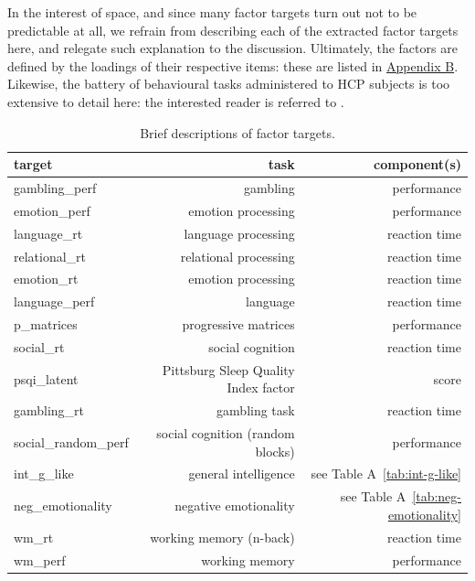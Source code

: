 \documentclass{article}
\begin{document}
%

In the interest of space, and since many factor targets turn out not to be
predictable at all, we refrain from describing each of the extracted factor
targets here, and relegate such explanation to the discussion. Ultimately,
the factors are defined by the loadings of their respective items: these are
listed in \hyperref[sec:appendix-b]{Appendix B}. Likewise, the battery of
behavioural tasks administered to HCP subjects is too extensive to detail
here: the interested reader is referred to \citet{Barch2013}.

\begin{table}
\centering
\caption{Brief descriptions of factor targets. } \label{tab:target-descs}
\begin{tabular}{lrr}
	\toprule
	target & task & component(s)  \\
	\midrule
	gambling\_perf       & gambling              & performance   \\
	emotion\_perf        & emotion processing    & performance   \\
	language\_rt         & language processing   & reaction time \\
	relational\_rt       & relational processing & reaction time \\
	emotion\_rt          & emotion processing    & reaction time \\
	language\_perf       & language              & reaction time \\
	p\_matrices          & progressive matrices  & performance   \\
	social\_rt           & social cognition      & reaction time \\
	psqi\_latent         & Pittsburg Sleep Quality Index factor \citep{buyssePittsburghSleepQuality1989} & score \\
	gambling\_rt         & gambling task         & reaction time \\
	social\_random\_perf & social cognition (random blocks) & performance \\
	int\_g\_like         & general intelligence & see Table A~\ref{tab:int-g-like} \\
	neg\_emotionality    & negative emotionality & see Table A~\ref{tab:neg-emotionality} \\
	wm\_rt               & working memory (n-back) & reaction time \\
	wm\_perf             & working memory          & performance \\
	\bottomrule
\end{tabular}
\end{table}
\end{document}
